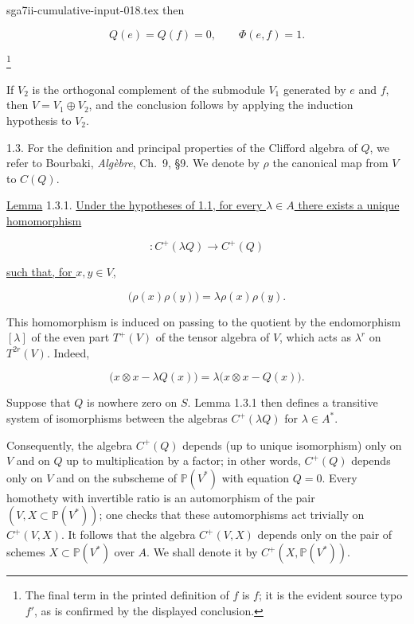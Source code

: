 \begin{filecontents*}{sga7ii-cumulative-input-018.tex}
then

\begin{equation*}
Q(e)=Q(f)=0,\qquad \Phi(e,f)=1.
\end{equation*}

\footnote{The final term in the printed definition of $f$ is $f$; it is
the evident source typo $f'$, as is confirmed by the displayed
conclusion.}

If $V_2$ is the orthogonal complement of the submodule $V_1$ generated
by $e$ and $f$, then $V=V_1\oplus V_2$, and the conclusion follows by
applying the induction hypothesis to $V_2$.

1.3. For the definition and principal properties of the Clifford algebra
of $Q$, we refer to Bourbaki, \emph{Algèbre}, Ch.~9, \S9.  We denote by
$\rho$ the canonical map from $V$ to $C(Q)$.

\underline{Lemma} 1.3.1. \underline{Under the hypotheses of 1.1, for
every $\lambda\in A$ there exists a unique homomorphism}

\begin{equation*}
[\lambda]\colon C^+(\lambda Q)\longrightarrow C^+(Q)
\end{equation*}

\underline{such that, for $x,y\in V$,}

\begin{equation*}
[\lambda]\bigl(\rho(x)\rho(y)\bigr)
=\lambda\rho(x)\rho(y).
\end{equation*}


This homomorphism is induced on passing to the quotient by the
endomorphism $[\lambda]$ of the even part $T^+(V)$ of the tensor algebra
of $V$, which acts as $\lambda^r$ on $T^{2r}(V)$.  Indeed,

\begin{equation*}
[\lambda]\bigl(x\otimes x-\lambda Q(x)\bigr)
=\lambda\bigl(x\otimes x-Q(x)\bigr).
\end{equation*}

Suppose that $Q$ is nowhere zero on $S$.  Lemma 1.3.1 then defines a
transitive system of isomorphisms between the algebras $C^+(\lambda Q)$
for $\lambda\in A^*$.

Consequently, the algebra $C^+(Q)$ depends (up to unique isomorphism)
only on $V$ and on $Q$ up to multiplication by a factor; in other words,
$C^+(Q)$ depends only on $V$ and on the subscheme of $\mathbb P(V^*)$
with equation $Q=0$.  Every homothety with invertible ratio is an
automorphism of the pair $(V,X\subset\mathbb P(V^*))$; one checks that
these automorphisms act trivially on $C^+(V,X)$.  It follows that the
algebra $C^+(V,X)$ depends only on the pair of schemes
$X\subset\mathbb P(V^*)$ over $A$.  We shall denote it by
$C^+(X,\mathbb P(V^*))$.
\end{filecontents*}
